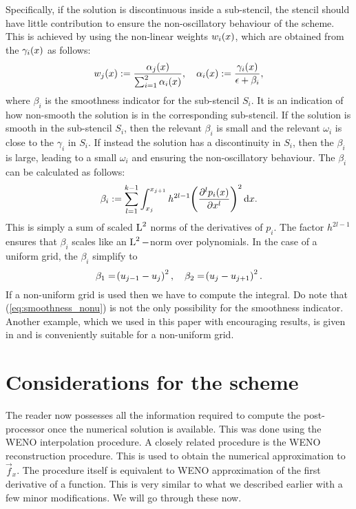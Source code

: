 \documentclass{amsart}
\theoremstyle{definition}
\theoremstyle{remark}
\numberwithin{equation}{section}
\begin{document}
	Specifically, if the solution is discontinuous inside a sub-stencil, the stencil
	should have little contribution to ensure the non-oscillatory
	behaviour of the scheme.  This is achieved by using the non-linear
	weights $w_i\!\left({x}\right)$, which are obtained from the $\gamma_i\!\left({x}\right)$ as
	follows:
	\begin{equation}
		w_j\!\left({x}\right):=\frac{\alpha_j\!\left({x}\right)}{\sum_{i=1}^2\alpha_i\!\left({x}\right)},\quad \alpha_i\!\left({x}\right):=\frac{\gamma_i\!\left({x}\right)}{\epsilon +\beta_i},
	\end{equation}
	where $\beta_i$ is the {smoothness indicator} for the sub-stencil
	$S_i$.  It is an indication of how non-smooth the solution is in the
	corresponding sub-stencil.  If the solution is smooth in the
	sub-stencil $S_i$, then the relevant $\beta_i$ is small and the
	relevant $\omega_i$ is close to the $\gamma_i$ in $S_i$. If instead
	the solution has a discontinuity in $S_i$, then the $\beta_i$ is
	large, leading to a small $\omega_i$ and ensuring the non-oscillatory
	behaviour.  The $\beta_i$ can be calculated as follows:
	\begin{equation}\label{eq:smoothness_nonu}
		\beta_i:=\sum_{l=1}^{k-1}\int^{x_{j+1}}_{x_j}h^{2l-1}\!\left({\frac{\partial^lp_i\!\left({x}\right)}{\partial x^l}}\right)^2\mathrm{d}x.
	\end{equation}
	This is simply a sum of scaled $\operatorname L^{2}$ norms of the derivatives of $p_i$.  The factor $h^{2l-1}$ ensures that $\beta_i$ scales like an $\operatorname L^{2}-$norm over polynomials. In the case of a uniform grid, the $\beta_i$ simplify to 
	\begin{equation}
		\beta_1=\!\left({u_{j-1}-u_j}\right)^2,\quad \beta_2=\!\left({u_j-u_{j+1}}\right)^2.
	\end{equation}
	If a non-uniform grid is used then we have to  compute the integral.   Do note that (\ref{eq:smoothness_nonu}) is not the only possibility for the smoothness indicator.  Another example, which we used in this paper with encouraging results, is given in  \cite[\S3.3.2]{janett2019novel} and is conveniently suitable for a non-uniform grid.
	\section{Considerations for the scheme}
	The reader now possesses all the information required to compute the post-processor once the numerical solution is available. This was done using the WENO interpolation procedure.  A closely related  procedure is the WENO reconstruction procedure.  This is used to obtain the numerical approximation to $\vec{f}_x$.  The procedure itself is equivalent to  WENO approximation of the first derivative of a function.  This is very similar to what we described earlier with a few minor modifications.  We will go through these now.   
	
\end{document}
